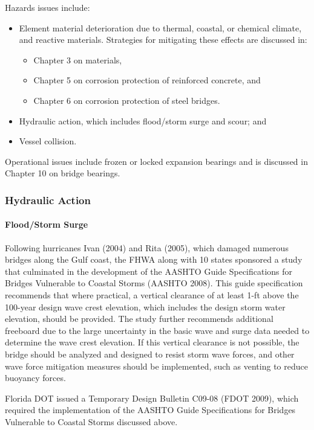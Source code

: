 Hazards issues include:
\begin{itemize}
  \item Element material deterioration due to thermal, coastal, or chemical climate, and reactive materials.
  Strategies for mitigating these effects are discussed in:
  \begin{itemize}
    \item Chapter 3 on materials,
    \item Chapter 5 on corrosion protection of reinforced concrete, and
    \item Chapter 6 on corrosion protection of steel bridges.
  \end{itemize}
  \item Hydraulic action, which includes flood/storm surge and scour; and
  \item  Vessel collision.
\end{itemize}
Operational issues include frozen or locked expansion bearings and is discussed in Chapter 10 on bridge
bearings.

\subsubsection*{Hydraulic Action}
\paragraph*{Flood/Storm Surge}
Following hurricanes Ivan (2004) and Rita (2005), which damaged numerous bridges along the Gulf coast, the FHWA along with 10 states sponsored a study that culminated in the development of the AASHTO Guide Specifications for Bridges Vulnerable to Coastal Storms (AASHTO 2008). This guide specification recommends that where practical, a vertical clearance of at least 1-ft above the 100-year design wave crest elevation, which includes the design storm water elevation, should be provided. The study further recommends additional freeboard due to the large uncertainty in the basic wave and surge data needed to determine the wave crest elevation. If this vertical clearance is not possible, the bridge should be analyzed and designed to resist storm wave forces, and other wave force mitigation measures should be implemented, such as venting to reduce buoyancy forces.

Florida DOT issued a Temporary Design Bulletin C09-08 (FDOT 2009), which required the implementation of the AASHTO Guide Specifications for Bridges Vulnerable to Coastal Storms discussed above.

